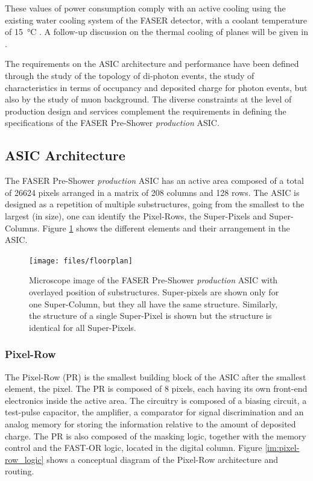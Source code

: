 		These values of power consumption comply with an active cooling using the existing water cooling system of the FASER detector, with a coolant temperature of \SI{15}{\celsius} \cite{PreShower_TP}. A follow-up discussion on the thermal cooling of planes will be given in .
		
		
		The requirements on the ASIC architecture and performance have been defined through the study of the topology of di-photon events, the study of characteristics in terms of occupancy and deposited charge for photon events, but also by the study of muon background. The diverse constraints at the level of production design and services complement the requirements in defining the specifications of the FASER Pre-Shower \textit{production} ASIC.   
		
		
		\subsection{ASIC Architecture}
		The FASER Pre-Shower \textit{production} ASIC has an active area composed of a total of 26624 pixels arranged in a matrix of 208 columns and 128 rows. The ASIC is designed as a repetition of multiple substructures, going from the smallest to the largest (in size), one can identify the Pixel-Rows, the Super-Pixels and Super-Columns. Figure \ref{im:prodASIC_floorplan} shows the different elements and their arrangement in the ASIC. 
		
		\begin{figure}[h]
			\centering
			\texttt{[image: files/floorplan]}
			\caption{Microscope image of the FASER Pre-Shower \textit{production} ASIC with overlayed position of substructures. Super-pixels are shown only for one Super-Column, but they all have the same structure. Similarly, the structure of a single Super-Pixel is shown but the structure is identical for all Super-Pixels.}
			\label{im:prodASIC_floorplan}
		\end{figure}
		 
			\subsubsection{Pixel-Row}
			The Pixel-Row (PR) is the smallest building block of the ASIC after the smallest element, the pixel. The PR is composed of 8 pixels, each having its own front-end electronics inside the active area. The circuitry is composed of a biasing circuit, a test-pulse capacitor, the amplifier, a comparator for signal discrimination and an analog memory for storing the information relative to the amount of deposited charge. The PR is also composed of the masking logic, together with the memory control and the FAST-OR logic, located in the digital column. Figure \ref{im:pixel-row_logic} shows a conceptual diagram of the Pixel-Row architecture and routing. 
			
